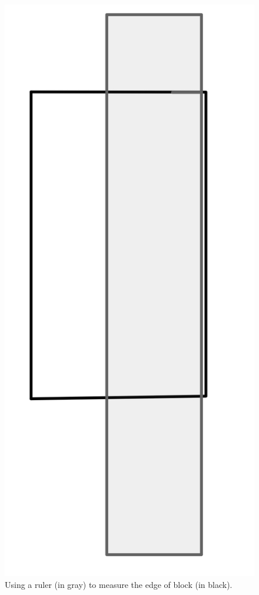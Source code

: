 \documentclass{article}
\begin{document}
\begin{figure}[!htbp]
	\centering
	\includegraphics[totalheight=8cm]{IMG_0621.jpeg}
	\caption{Using a ruler (in gray) to measure the edge of block (in black).}
	\label{fig:ruler-block}
\end{figure}
\end{document}
